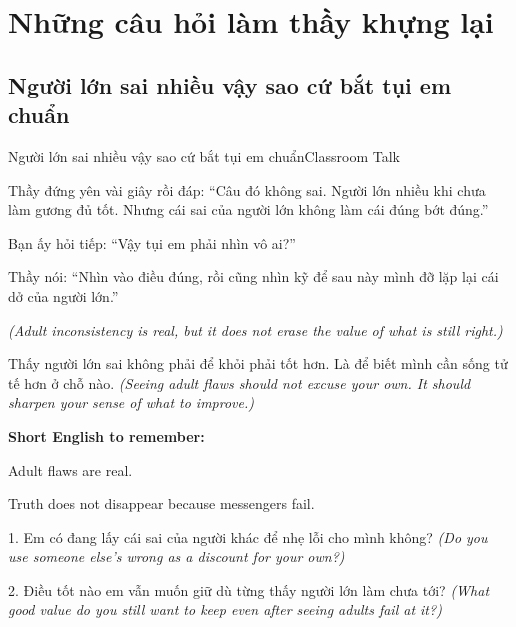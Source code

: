 \chapter{Những câu hỏi làm thầy khựng lại}

\section{Người lớn sai nhiều vậy sao cứ bắt tụi em chuẩn}
\begin{truyen}{Người lớn sai nhiều vậy sao cứ bắt tụi em chuẩn}{Classroom Talk}

Thầy đứng yên vài giây rồi đáp: ``Câu đó không sai. Người lớn nhiều khi chưa làm gương đủ tốt. Nhưng cái sai của người lớn không làm cái đúng bớt đúng.''

Bạn ấy hỏi tiếp: ``Vậy tụi em phải nhìn vô ai?''

Thầy nói: ``Nhìn vào điều đúng, rồi cũng nhìn kỹ để sau này mình đỡ lặp lại cái dở của người lớn.''

\textit{(Adult inconsistency is real, but it does not erase the value of what is still right.)}
\end{truyen}

\begin{baihoc}
Thấy người lớn sai không phải để khỏi phải tốt hơn. Là để biết mình cần sống tử tế hơn ở chỗ nào.
\textit{(Seeing adult flaws should not excuse your own. It should sharpen your sense of what to improve.)}
\end{baihoc}

\begin{ghinhoanh}
\textbf{Short English to remember:}

Adult flaws are real.

Truth does not disappear because messengers fail.
\end{ghinhoanh}

\begin{tuhocnhanh}
1. Em có đang lấy cái sai của người khác để nhẹ lỗi cho mình không? \textit{(Do you use someone else’s wrong as a discount for your own?)}

2. Điều tốt nào em vẫn muốn giữ dù từng thấy người lớn làm chưa tới? \textit{(What good value do you still want to keep even after seeing adults fail at it?)}
\end{tuhocnhanh}
\ngancach

